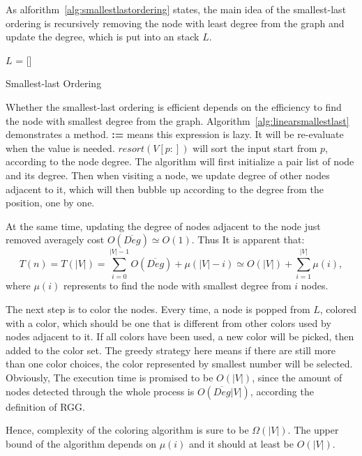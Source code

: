 \documentclass[prodmode,acmtecs]{acmsmall} %
\begin{document}
As alforithm~\ref{alg:smallestlastordering} states, the main idea of the smallest-last ordering is recursively removing the node with least degree from the graph and update the degree, which is put into an stack $L$.

\begin{algorithm}[t]
\SetAlgoNoLine
{}
$L$ = []\;
\caption{Smallest-last Ordering}
\label{alg:smallestlastordering}
\end{algorithm}

Whether the smallest-last ordering is efficient depends on the efficiency to find the node with smallest degree from the graph. Algorithm~\ref{alg:linearsmallestlast} demonstrates a method. \textbf{:=} means this expression is lazy. It will be re-evaluate when the value is needed. $resort(V[p:])$ will sort the input start from $p$, according to the node degree. The algorithm will first initialize a pair list of node and its degree. Then when visiting a node, we update degree of other nodes adjacent to it, which will then bubble up according to the degree from the position, one by one. 

At the same time, updating the degree of nodes adjacent to the node just removed averagely cost $O(\overline{Deg}) \simeq O(1)$. Thus It is apparent that:
\begin{equation}
\label{eqn:slo}
T(n) = T(|V|) = \sum\limits_{i=0}^{|V|-1}O(\overline{Deg})+\mu(|V|-i) \simeq O(|V|) + \sum\limits_{i=1}^{|V|}\mu(i),
\end{equation}
where $\mu(i)$ represents to find the node with smallest degree from $i$ nodes.

The next step is to color the nodes. Every time, a node is popped from $L$, colored with a color, which should be one that is different from other colors used by nodes adjacent to it. If all colors have been used, a new color will be picked, then added to the color set. The greedy strategy here means if there are still more than one color choices, the color represented by smallest number will be selected. Obviously, The execution time is promised to be $O(|V|)$, since the amount of nodes detected through the whole process is $O(\overline{Deg}|V|)$, according the definition of RGG.

Hence, complexity of the coloring algorithm is sure to be $\Omega(|V|)$. The upper bound of the algorithm depends on $\mu(i)$ and it should at least be $O(|V|)$.
\end{document}

